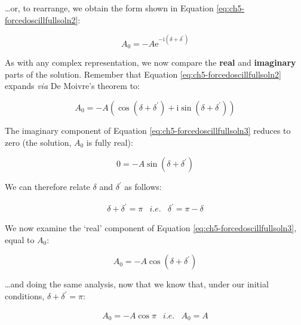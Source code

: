 \documentclass[
]{book}
\begin{document}
\ldots or, to rearrange, we obtain the form shown in Equation \eqref{eq:ch5-forcedoscillfullsoln2}:

\begin{equation}
A_0 = -A \mathrm{e}^{-\mathrm{i}\left( \delta + \delta^\prime \right)}
\label{eq:ch5-forcedoscillfullsoln2}
\end{equation}

As with any complex representation, we now compare the \textbf{real} and \textbf{imaginary} parts of the solution. Remember that Equation \eqref{eq:ch5-forcedoscillfullsoln2} expands \emph{via} De Moivre's theorem to:

\begin{equation}
A_0 = -A \left( \cos \left( \delta + \delta^\prime \right) + \mathrm{i} \sin \left( \delta + \delta^\prime \right)  \right)
\label{eq:ch5-forcedoscillfullsoln3}
\end{equation}

The imaginary component of Equation \eqref{eq:ch5-forcedoscillfullsoln3} reduces to zero (the solution, \(A_0\) is fully real):

\begin{equation}
0 = -A \sin \left( \delta + \delta^\prime \right)
\end{equation}

We can therefore relate \(\delta\) and \(\delta^\prime\) as follows:

\begin{equation}
\begin{array}{rcl}
\delta + \delta^\prime = \pi & \textit{i.e.} & \delta^\prime = \pi - \delta
\end{array}
\label{eq:ch5-forcedoscillationfullsoln4}
\end{equation}

We now examine the `real' component of Equation \eqref{eq:ch5-forcedoscillfullsoln3}, equal to \(A_0\):

\begin{equation}
A_0 = - A \cos \left( \delta + \delta^\prime \right)
\end{equation}

\ldots and doing the same analysis, now that we know that, under our initial conditions, \(\delta + \delta^\prime = \pi\):

\begin{equation}
\begin{array}{rcl}
A_0 = -A \cos \pi & \textit{i.e.} & A_0 = A
\end{array}
\label{eq:ch5-forcedoscillationfullsoln5}
\end{equation}
\end{document}
